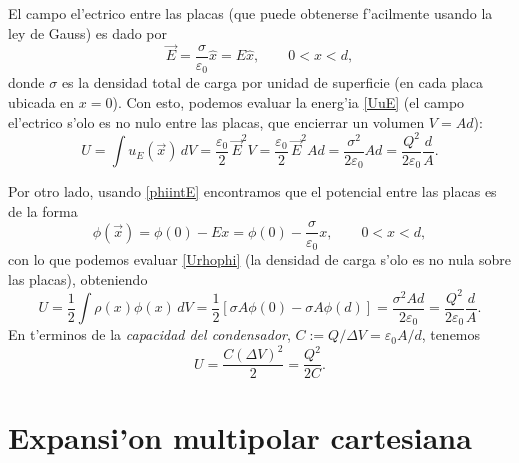 El campo el'ectrico entre las placas (que puede obtenerse f'acilmente usando la ley de Gauss) es dado por
\begin{equation}
\vec{E}=\frac{\sigma}{\varepsilon_0}\hat{x}=E\hat{x}, \qquad 0<x<d,
\end{equation}
donde $\sigma$ es la densidad total de carga por unidad de superficie (en cada placa ubicada en $x=0$). Con esto, podemos evaluar la energ'ia \eqref{UuE} (el campo el'ectrico s'olo es no nulo entre las placas, que encierrar un volumen $V=Ad$):
\begin{equation} 
U=\int u_E(\vec{x})\,dV=\frac{\varepsilon_0}{2}\,
\vec{E}^2 V=\frac{\varepsilon_0}{2}\,
\vec{E}^2 Ad=\frac{\sigma^2}{2\varepsilon_0}Ad=\frac{Q^2}{2\varepsilon_0}\frac{d}{A} .
\end{equation}

Por otro lado, usando \eqref{phiintE} encontramos que el potencial entre las placas es de la forma
\begin{equation}
\phi(\vec{x})=\phi(0)-Ex=\phi(0)-\frac{\sigma}{\varepsilon_0}x, \qquad 0<x<d,
\end{equation}
con lo que podemos evaluar \eqref{Urhophi} (la densidad de carga s'olo es no nula sobre las placas), obteniendo
\begin{equation}
U=\frac{1}{2}\int\rho(x)\phi(x)\,dV=\frac{1}{2}\left[\sigma A\phi(0)-\sigma A\phi(d)\right]=\frac{\sigma^2 Ad}{2\varepsilon_0}=\frac{Q^2}{2\varepsilon_0}\frac{d}{A}.
\end{equation}
En t'erminos de la \textit{capacidad del condensador}, $C:=Q/\Delta V=\varepsilon_0 A/d$, tenemos
\begin{equation}
U=\frac{C(\Delta V)^2}{2}=\frac{Q^2}{2C}.
\end{equation}





\section{Expansi'on multipolar cartesiana}
